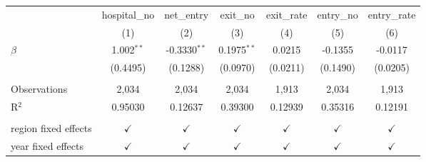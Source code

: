 \begingroup
\centering
\begin{tabular}{lcccccc}
   \toprule
                        & hospital\_no  & net\_entry     & exit\_no      & exit\_rate    & entry\_no     & entry\_rate\\   
                        & (1)           & (2)            & (3)           & (4)           & (5)           & (6)\\  
   \midrule 
   $\beta$              & 1.002$^{**}$  & -0.3330$^{**}$ & 0.1975$^{**}$ & 0.0215        & -0.1355       & -0.0117\\   
                        & (0.4495)      & (0.1288)       & (0.0970)      & (0.0211)      & (0.1490)      & (0.0205)\\   
    \\
   Observations         & 2,034         & 2,034          & 2,034         & 1,913         & 2,034         & 1,913\\  
   R$^2$                & 0.95030       & 0.12637        & 0.39300       & 0.12939       & 0.35316       & 0.12191\\  
    \\
   region fixed effects & $\checkmark$  & $\checkmark$   & $\checkmark$  & $\checkmark$  & $\checkmark$  & $\checkmark$\\   
   year fixed effects   & $\checkmark$  & $\checkmark$   & $\checkmark$  & $\checkmark$  & $\checkmark$  & $\checkmark$\\   
   \bottomrule
\end{tabular}
\par\endgroup
